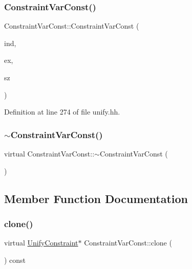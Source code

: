 \subsubsection{\texorpdfstring{ConstraintVarConst()}{ConstraintVarConst()}}
{\footnotesize\ttfamily Constraint\+Var\+Const\+::\+Constraint\+Var\+Const (\begin{DoxyParamCaption}\item[{int4}]{ind,  }\item[{\mbox{\hyperlink{class_r_h_s_constant}{R\+H\+S\+Constant}} $\ast$}]{ex,  }\item[{\mbox{\hyperlink{class_r_h_s_constant}{R\+H\+S\+Constant}} $\ast$}]{sz }\end{DoxyParamCaption})\hspace{0.3cm}{\ttfamily [inline]}}



Definition at line 274 of file unify.\+hh.

\mbox{\label{class_constraint_var_const_a0f136de462b3babc2b41645cbeed8ee8}} 
\subsubsection{\texorpdfstring{$\sim$ConstraintVarConst()}{~ConstraintVarConst()}}
{\footnotesize\ttfamily virtual Constraint\+Var\+Const\+::$\sim$\+Constraint\+Var\+Const (\begin{DoxyParamCaption}\item[{void}]{ }\end{DoxyParamCaption})\hspace{0.3cm}{\ttfamily [virtual]}}



\subsection{Member Function Documentation}
\mbox{\label{class_constraint_var_const_a5cb644447fed3576d92e25d3349eb387}} 
\subsubsection{\texorpdfstring{clone()}{clone()}}
{\footnotesize\ttfamily virtual \mbox{\hyperlink{class_unify_constraint}{Unify\+Constraint}}$\ast$ Constraint\+Var\+Const\+::clone (\begin{DoxyParamCaption}\item[{void}]{ }\end{DoxyParamCaption}) const\hspace{0.3cm}{\ttfamily [virtual]}}



